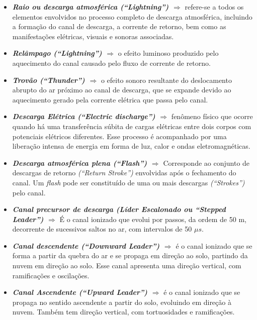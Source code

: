 \documentclass[a4paper, 12pt, onecolumn,singlespacing]{article}
\begin{document}
	\begin{itemize}
		\item \textbf{\textit{Raio ou descarga atmosférica (``Lightning'') $\Rightarrow$ }}refere-se a todos os elementos envolvidos no processo completo de descarga atmosférica, incluindo a formação do canal de descarga, a corrente de retorno, bem como as manifestações elétricas, visuais e sonoras associadas.
		
		\item \textbf{\textit{Relâmpago (``Lightning'') $\Rightarrow$ }} o efeito luminoso produzido pelo aquecimento do canal causado pelo fluxo de corrente de retorno.
		
		\item \textbf{\textit{Trovão (``Thunder'') $\Rightarrow$ }}o efeito sonoro resultante do deslocamento abrupto do ar próximo ao canal de descarga, que se expande devido ao aquecimento gerado pela corrente elétrica que passa pelo canal.
		
		\item \textbf{\textit{Descarga Elétrica (``Electric	discharge'') $\Rightarrow$ }}fenômeno físico que ocorre quando há uma transferência súbita de cargas elétricas entre dois corpos com potenciais elétricos diferentes. Esse processo é acompanhado por uma liberação intensa de energia em forma de luz, calor e ondas eletromagnéticas.
		
		\item \textbf{\textit{Descarga atmosférica plena (``Flash'') $\Rightarrow$ }} Corresponde ao conjunto de descargas de retorno \textit{(``Return Stroke'')} envolvidas após o fechamento do canal. Um \textit{flash} pode ser constituído de	uma ou mais descargas \textit{(``Strokes'')} pelo canal.
		
		\item \textbf{\textit{Canal precursor de descarga (Líder Escalonado ou ``Stepped Leader'') $\Rightarrow$ }}É o canal ionizado que evolui por passos, da ordem de 50 m, decorrente de
		sucessivos saltos no ar, com intervalos de 50 $\mu s$.
		
		\item \textbf{\textit{Canal descendente (``Downward Leader'') $\Rightarrow$ }}é o canal ionizado que se forma a partir da quebra do ar e se propaga em direção ao solo, partindo da nuvem em direção ao solo. Esse canal apresenta uma direção vertical, com ramificações e oscilações.
		
		\item \textbf{\textit{Canal Ascendente (``Upward Leader'') $\Rightarrow$ }}é o canal ionizado que se propaga no sentido ascendente a partir do solo, evoluindo em direção à nuvem. Também tem direção vertical, com tortuosidades e ramificações.
		

\end{itemize}
\end{document}

